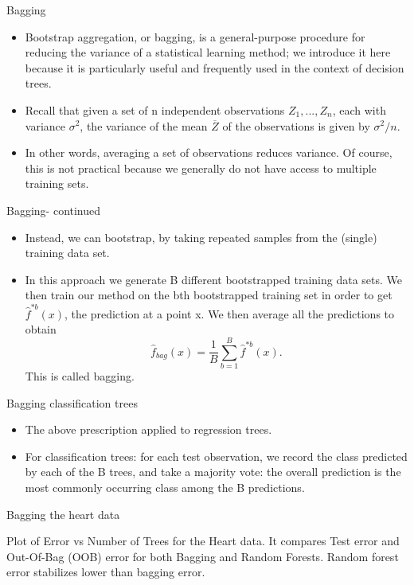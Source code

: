 \documentclass[aspectratio=169, 11pt]{beamer}
\begin{document}
\begin{frame}{Bagging}
\begin{itemize}
    \item Bootstrap aggregation, or bagging, is a general-purpose procedure for reducing the variance of a statistical learning method; we introduce it here because it is particularly useful and frequently used in the context of decision trees.
    \item Recall that given a set of n independent observations $Z_{1},...,Z_{n}$, each with variance $\sigma^{2}$, the variance of the mean $\overline{Z}$ of the observations is given by $\sigma^{2}/n$.
    \item In other words, averaging a set of observations reduces variance. Of course, this is not practical because we generally do not have access to multiple training sets.
\end{itemize}
\end{frame}

\begin{frame}{Bagging- continued}
\begin{itemize}
    \item Instead, we can bootstrap, by taking repeated samples from the (single) training data set.
    \item In this approach we generate B different bootstrapped training data sets. We then train our method on the bth bootstrapped training set in order to get $\hat{f}^{*b}(x)$, the prediction at a point x. We then average all the predictions to obtain
    \begin{equation*}
    \hat{f}_{bag}(x)=\frac{1}{B}\sum_{b=1}^{B}\hat{f}^{*b}(x).
    \end{equation*}
    This is called bagging.
\end{itemize}
\end{frame}

\begin{frame}{Bagging classification trees}
\begin{itemize}
    \item The above prescription applied to regression trees.
    \item For classification trees: for each test observation, we record the class predicted by each of the B trees, and take a majority vote: the overall prediction is the most commonly occurring class among the B predictions.
\end{itemize}
\end{frame}

\begin{frame}{Bagging the heart data}
\begin{tcolorbox}[colback=LightGray,title=Figure]
Plot of Error vs Number of Trees for the Heart data. It compares Test error and Out-Of-Bag (OOB) error for both Bagging and Random Forests. Random forest error stabilizes lower than bagging error.
\end{tcolorbox}
\end{frame}
\end{document}
